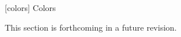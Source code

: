 
 [colors] {Colors}

\pnum
This section is forthcoming in a future revision.

\addtocounter{SectionDepthBase}{1}


\addtocounter{SectionDepthBase}{-1}
